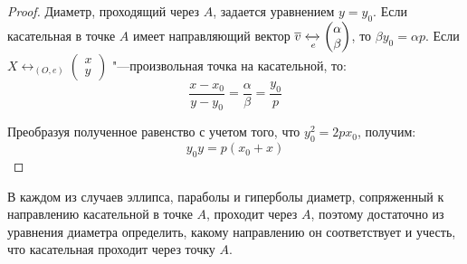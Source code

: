 \begin{proof}
	Диаметр, проходящий через $A$, задается уравнением $y = y_0$. Если касательная в точке $A$ имеет направляющий вектор $\overline{v} \xleftrightarrow[e]{} \begin{pmatrix}\alpha\\\beta\end{pmatrix}$, то $\beta y_0 = \alpha p$. Если $X \leftrightarrow_{(O, e)} \begin{pmatrix}x\\y\end{pmatrix}$ "---произвольная точка на касательной, то:
	\[\frac{x - x_0}{y - y_0} = \frac{\alpha}{\beta} = \frac{y_0}{p}\]
	
	Преобразуя полученное равенство с учетом того, что $y_0^2 = 2px_0$, получим:
	\[y_0y = p(x_0 + x)\]
\end{proof}

\begin{note}
	В каждом из случаев эллипса, параболы и гиперболы диаметр, сопряженный к направлению касательной в точке $A$, проходит через $A$, поэтому достаточно из уравнения диаметра определить, какому направлению он соответствует и учесть, что касательная проходит через точку $A$.
\end{note}